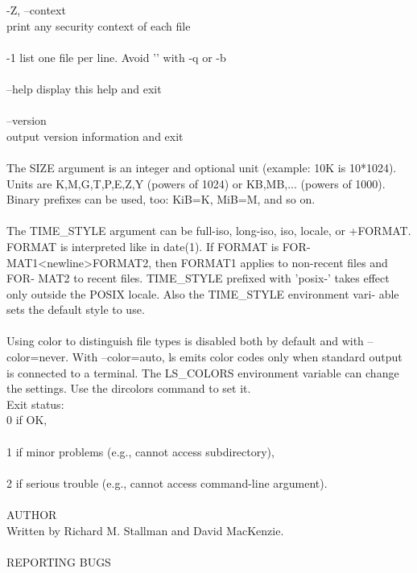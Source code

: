 \documentclass{article}
\begin{document}
       -Z, --context \\
              print any security context of each file \\
\\
       -1     list one file per line.  Avoid '\n' with -q or -b \\
\\
       --help display this help and exit \\
\\
       --version \\
              output version information and exit \\
\\
       The  SIZE  argument  is  an  integer and optional unit (example: 10K is
       10*1024).  Units are K,M,G,T,P,E,Z,Y  (powers  of  1024)  or  KB,MB,...
       (powers  of 1000).  Binary prefixes can be used, too: KiB=K, MiB=M, and
       so on. \\
\\
       The TIME_STYLE argument can be  full-iso,  long-iso,  iso,  locale,  or
       +FORMAT.   FORMAT  is  interpreted  like in date(1).  If FORMAT is FOR‐
       MAT1<newline>FORMAT2, then FORMAT1 applies to non-recent files and FOR‐
       MAT2  to  recent files.  TIME_STYLE prefixed with 'posix-' takes effect
       only outside the POSIX locale.  Also the TIME_STYLE  environment  vari‐
       able sets the default style to use. \\
\\
       Using  color  to distinguish file types is disabled both by default and
       with --color=never.  With --color=auto, ls emits color codes only  when
       standard  output is connected to a terminal.  The LS_COLORS environment
       variable can change the settings.  Use the dircolors command to set it.
\\
   Exit status: \\
       0      if OK, \\
\\
       1      if minor problems (e.g., cannot access subdirectory), \\
\\
       2      if serious trouble (e.g., cannot access command-line argument). \\
\\
AUTHOR \\
       Written by Richard M. Stallman and David MacKenzie. \\
\\
REPORTING BUGS \\
\end{document}

